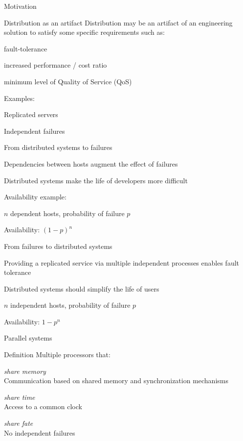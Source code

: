 \begin{frame}{Motivation}
	
\begin{block}{Distribution as an artifact}
Distribution may be an artifact of an engineering solution to satisfy some specific requirements such as:
\BI
\item fault-tolerance
\item increased performance / cost ratio
\item minimum level of Quality of Service (QoS)
\EI
\end{block}

\bigskip
Examples:
\BI
\item Replicated servers
\EI
\end{frame}

\begin{frame}{Independent failures}

\begin{block}{From distributed systems to failures}
\BI
\item Dependencies between hosts augment the effect of failures
\item Distributed systems make the life of developers more difficult
\item Availability example:
\BI
\item $n$ dependent hosts, probability of failure $p$
\item Availability: $(1-p)^n$
\EI
\EI
\end{block}
\bigskip
\begin{block}{From failures to distributed systems}
\BI
\item Providing a replicated service via multiple independent processes enables fault tolerance
\item Distributed systems should simplify the life of users
\BI
\item $n$ independent hosts, probability of failure $p$
\item Availability: $1-p^n$
\EI
\EI
\end{block}
\end{frame}

\begin{frame}{Parallel systems}

\begin{block}{Definition}
Multiple processors that:
\BI
\item  \emph{share memory}\\
Communication based on shared memory and synchronization mechanisms
\item \emph{share time}\\
Access to a common clock
\item \emph{share fate}\\
No independent failures
\EI
\end{block}
\end{frame}

